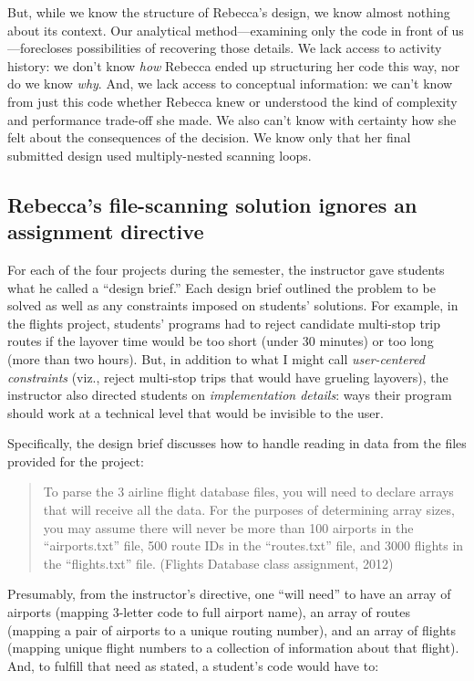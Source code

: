 But, while we know the structure of Rebecca's design, we know almost nothing about its context. Our analytical method---examining only the code in front of us---forecloses possibilities of recovering those details. We lack access to activity history: we don't know \emph{how} Rebecca ended up structuring her code this way, nor do we know \emph{why}. And, we lack access to conceptual information: we can't know from just this code whether Rebecca knew or understood the kind of complexity and performance trade-off she made. We also can't know with certainty how she felt about the consequences of the decision. We know only that her final submitted design used multiply-nested scanning loops.

\subsection{Rebecca's file-scanning solution ignores an assignment directive}\label{rebeccas-file-scanning-solution-ignores-an-assignment-directive}

For each of the four projects during the semester, the instructor gave students what he called a ``design brief.'' Each design brief outlined the problem to be solved as well as any constraints imposed on students' solutions. For example, in the flights project, students' programs had to reject candidate multi-stop trip routes if the layover time would be too short (under 30 minutes) or too long (more than two hours). But, in addition to what I might call \emph{user-centered constraints} (viz., reject multi-stop trips that would have grueling layovers), the instructor also directed students on \emph{implementation details}: ways their program should work at a technical level that would be invisible to the user.

Specifically, the design brief discusses how to handle reading in data from the files provided for the project:

\begin{quote}
To parse the 3 airline flight database files, you will need to declare arrays that will receive all the data. For the purposes of determining array sizes, you may assume there will never be more than 100 airports in the ``airports.txt'' file, 500 route IDs in the ``routes.txt'' file, and 3000 flights in the ``flights.txt'' file. (Flights Database class assignment, 2012)
\end{quote}

Presumably, from the instructor's directive, one ``will need'' to have an array of airports (mapping 3-letter code to full airport name), an array of routes (mapping a pair of airports to a unique routing number), and an array of flights (mapping unique flight numbers to a collection of information about that flight). And, to fulfill that need as stated, a student's code would have to:

